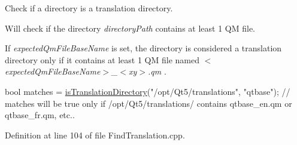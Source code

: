 Check if a directory is a translation directory. 

Will check if the directory {\itshape directory\+Path} contains at least 1 QM file.

If {\itshape expected\+Qm\+File\+Base\+Name} is set, the directory is considered a translation directory only if it contains at least 1 QM file named $<${\itshape expected\+Qm\+File\+Base\+Name$>$\+\_\+$<$xy$>$.\+qm} .


\begin{DoxyCode}
\textcolor{keywordtype}{bool} matches = \hyperlink{namespace_mdt_1_1_translation_a641c0ee60dbd128ecc2b050f17f863fc}{isTranslationDirectory}(\textcolor{stringliteral}{"/opt/Qt5/translations"}, \textcolor{stringliteral}{"qtbase"});
\textcolor{comment}{// matches will be true only if /opt/Qt5/translations/ contains qtbase\_en.qm or qtbase\_fr.qm, etc..}
\end{DoxyCode}
 

Definition at line 104 of file Find\+Translation.\+cpp.

